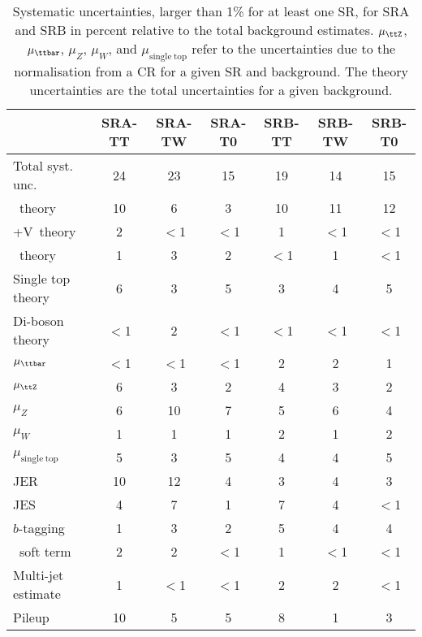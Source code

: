 			\begin{table}[htpb]
				\caption{Systematic uncertainties, larger than 1\% for at
			    least one \ac{SR}, for SRA and SRB in percent relative to the total
			    background estimates. $\mu_{\ttZ}$, $\mu_{\ttbar}$, $\mu_{Z}$, $\mu_{W}$,
			    and $\mu_{\mathrm{single~top}}$ refer to the uncertainties due to the normalisation
			    from a \ac{CR} for a given \ac{SR} and background. The theory uncertainties are the
			    total uncertainties for a given background.}%
			    \label{tab:systSRAB}
				\begin{center}
				\renewcommand{\arraystretch}{1.2}
					\begin{tabular}{lcccccc}
						\toprule
						& {\textbf{SRA-TT}} & {\textbf{SRA-TW}} & {\textbf{SRA-T0}} & {\textbf{SRB-TT}} & {\textbf{SRB-TW}} & {\textbf{SRB-T0}}\\ \midrule
						{Total syst. unc.} & 24 & 23 & 15 & 19 & 14 & 15\\ \midrule
						{\ttbar\ theory} & 10 & 6 & 3 & 10 & 11 & 12\\  
						{\ttbar+V\ theory} & 2 & {$<$1\phantom{15}} & {$<$1\phantom{15}} & 1 & {$<$1\phantom{15}} & {$<$1\phantom{15}}\\  
						{\Zboson\ theory} & 1 & 3 & 2 & {$<$1\phantom{15}} & 1 & {$<$1\phantom{15}}\\  
						{Single top theory} & 6 & 3 & 5 & 3 & 4 & 5\\  
						{Di-boson theory} & {$<$1\phantom{15}} & 2 & {$<$1\phantom{15}} & {$<$1\phantom{15}} & {$<$1\phantom{15}} & {$<$1\phantom{15}}\\  
						{$\mu_{\ttbar}$} & {$<$1\phantom{15}} & {$<$1\phantom{15}} & {$<$1\phantom{15}} & 2 & 2 & 1\\  
						{$\mu_{\ttZ}$} & 6 & 3 & 2 & 4 & 3 & 2\\  
						{$\mu_{Z}$} & 6 & 10 & 7 & 5 & 6 & 4\\  
						{$\mu_{W}$} & 1 & 1 & 1 & 2 & 1 & 2\\  
						{$\mu_{\mathrm{single~top}}$} & 5 & 3 & 5 & 4 & 4 & 5\\  
						{JER} & 10 & 12 & 4 & 3 & 4 & 3\\  
						{JES} & 4 & 7 & 1 & 7 & 4 & {$<$1\phantom{15}}\\  
						{$b$-tagging} & 1 & 3 & 2 & 5 & 4 & 4\\  
						{\met\ soft term} & 2 & 2 & {$<$1\phantom{15}} & 1 & {$<$1\phantom{15}} & {$<$1\phantom{15}}\\  
						{Multi-jet estimate} & 1 & {$<$1\phantom{15}} & {$<$1\phantom{15}} & 2 & 2 & {$<$1\phantom{15}}\\  
						{Pileup} & 10 & 5 & 5 & 8 & 1 & 3\\  
						\bottomrule
					\end{tabular}
				\end{center}
			\end{table}

